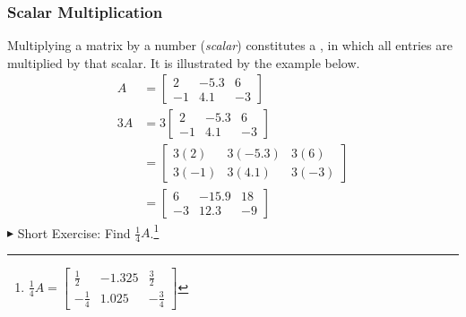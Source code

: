 \subsubsection{Scalar Multiplication} Multiplying a matrix by a number (\textit{scalar}) constitutes a , in which all entries are multiplied by that scalar. It is illustrated by the example below.
\begin{align*}
A &= 
\begin{bmatrix}
2 & -5.3 & 6 \\
-1 & 4.1 & -3
\end{bmatrix} \\
3A &= 3
\begin{bmatrix}
2 & -5.3 & 6 \\
-1 & 4.1 & -3
\end{bmatrix} \\
&=
\begin{bmatrix}
3(2) & 3(-5.3) & 3(6) \\
3(-1) & 3(4.1) & 3(-3)
\end{bmatrix} \\
&=
\begin{bmatrix}
6 & -15.9 & 18 \\
-3 & 12.3 & -9
\end{bmatrix}
\end{align*}
$\blacktriangleright$ Short Exercise: Find $\frac{1}{4}A$.\footnote{$\frac{1}{4}A = \begin{bmatrix}
\frac{1}{2} & -1.325 & \frac{3}{2} \\
-\frac{1}{4} & 1.025 & -\frac{3}{4}
\end{bmatrix}$}

